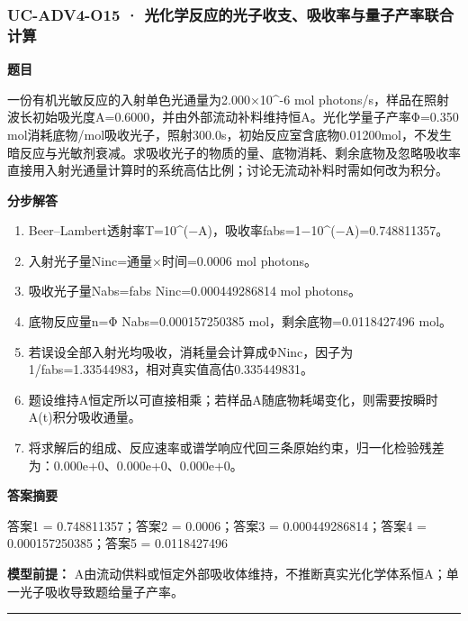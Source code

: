 \documentclass[UTF8,11pt,a4paper]{ctexart}
\begin{document}
\subsubsection*{UC-ADV4-O15 · 光化学反应的光子收支、吸收率与量子产率联合计算}
\noindent\textbf{题目}\par
一份有机光敏反应的入射单色光通量为2.000×10\textasciicircum{}-6 mol photons/s，样品在照射波长初始吸光度A=0.6000，并由外部流动补料维持恒A。光化学量子产率Φ=0.350 mol消耗底物/mol吸收光子，照射300.0s，初始反应室含底物0.01200mol，不发生暗反应与光敏剂衰减。求吸收光子的物质的量、底物消耗、剩余底物及忽略吸收率直接用入射光通量计算时的系统高估比例；讨论无流动补料时需如何改为积分。\par
\medskip\noindent\textbf{分步解答}
\begin{enumerate}
\item Beer–Lambert透射率T=10\textasciicircum{}(−A)，吸收率fabs=1−10\textasciicircum{}(−A)=0.748811357。
\item 入射光子量Ninc=通量×时间=0.0006 mol photons。
\item 吸收光子量Nabs=fabs Ninc=0.000449286814 mol photons。
\item 底物反应量n=Φ Nabs=0.000157250385 mol，剩余底物=0.0118427496 mol。
\item 若误设全部入射光均吸收，消耗量会计算成ΦNinc，因子为1/fabs=1.33544983，相对真实值高估0.335449831。
\item 题设维持A恒定所以可直接相乘；若样品A随底物耗竭变化，则需要按瞬时A(t)积分吸收通量。
\item 将求解后的组成、反应速率或谱学响应代回三条原始约束，归一化检验残差为：0.000e+0、0.000e+0、0.000e+0。
\end{enumerate}
\noindent\textbf{答案摘要}\par
答案1 = 0.748811357；答案2 = 0.0006；答案3 = 0.000449286814；答案4 = 0.000157250385；答案5 = 0.0118427496\par
\noindent\textbf{模型前提：}
A由流动供料或恒定外部吸收体维持，不推断真实光化学体系恒A；单一光子吸收导致题给量子产率。\par
\medskip\hrule\medskip
{}
\end{document}
